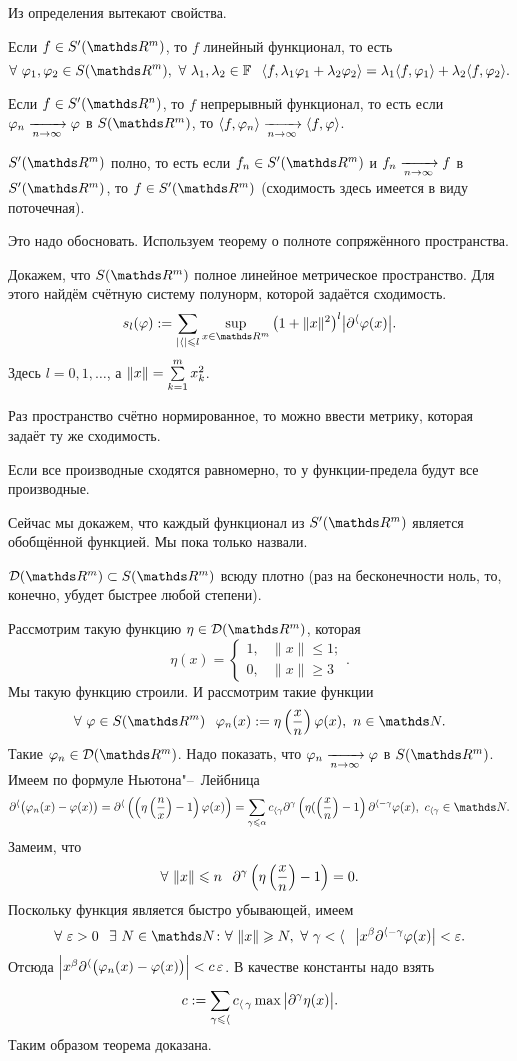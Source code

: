 Из определения вытекают свойства.
\begin{Ut}
 Если $f\in S'(\R^m)$, то $f$ линейный функционал, то есть 
\[
\forall\ \phi_1,\phi_2\in S(\R^m),\ \forall\ \l_1,\l_2\in\F\pau \la f,\l_1\phi_1+\l_2\phi_2\ra = \l_1\la f,\phi_1\ra + \l_2\la f,\phi_2\ra.
\]
\end{Ut}
\begin{Ut}
  Если $f\in S'(\R^n)$, то $f$ непрерывный функционал, то есть если $\varphi_n\xrightarrow[n\rightarrow\infty]{}\varphi$ в $S(\R^m)$, то $\langle f,\varphi_n\rangle\xrightarrow[n\rightarrow\infty]{} \langle f,\varphi\rangle$.
\end{Ut}
\begin{Ut}
$S'(\R^m)$ полно, то есть если $f_n\in S'(\R^m)$ и $f_n\xrightarrow[n\rightarrow\infty]{} f$ в $S'(\R^m)$, то $f\in S'(\R^m)$ (сходимость здесь имеется в виду поточечная).
\end{Ut}
Это надо обосновать. Используем теорему о полноте сопряжённого пространства.
\begin{Proof}
  Докажем, что $S(\R^m)$ полное линейное метрическое пространство. Для этого найдём счётную систему полунорм, которой задаётся сходимость.
\[
  s_l(\phi):=\sum\limits_{|\a|\le l}\sup\limits_{x\in\R^m}\big(1+\|x\|^2\big)^l\big|\dl^\a\phi(x)\big|.
\]
Здесь $l=0,1,\dots$, а $\|x\| = \sum\limits_{k = 1}^{m}x_k^2$.

Раз пространство счётно нормированное, то можно ввести метрику, которая задаёт ту же сходимость.

Если все производные сходятся равномерно, то у функции-предела будут все производные.
\end{Proof}
Сейчас мы докажем, что каждый функционал из $S'(\R^m)$ является обобщённой функцией. Мы пока только назвали.
\begin{Lem}
  $\D(\R^m)\subset S(\R^m)$ всюду плотно (раз на бесконечности ноль, то, конечно, убудет быстрее любой степени).
\end{Lem}
\begin{Proof}
  Рассмотрим такую функцию $\eta\in\D(\R^m)$, которая
\[\eta(x) = \begin{cases}
1,& \|x\|\le 1;\\ 0,&\|x\|\ge3
\end{cases}.\]
Мы такую функцию строили. И рассмотрим такие функции
\[
  \forall\ \phi\in S(\R^m)\pau \phi_n(x):=\eta\left(\frac xn\right)\phi(x),\ n\in\N.
\]
Такие $\phi_n\in\D(\R^m)$. Надо показать, что $\varphi_n\xrightarrow[n\rightarrow\infty]{} \varphi$ в $S(\R^m)$. Имеем по формуле Ньютона"--~Лейбница
\[
  \dl^\a\big(\phi_n(x)-\phi(x)\big) = \dl^\a\left(\left(\eta\left(\frac nx\right)-1\right)\phi(x)\right) = 
  \sum\limits_{\gamma\le \alpha}c_{\a\gamma}\dl^\gamma\left(\eta(\left(\frac xn\right)-1\right)\dl^{\a-\gamma}\phi(x),\ c_{\a\gamma}\in\N.
\]
Замеим, что
\[
  \forall\ \|x\|\le n\pau \dl^\g\left(\eta\left(\frac xn\right)-1\right)=0.
\]
Поскольку функция является быстро убывающей, имеем
\[
  \forall\ \e>0\pau \exists\ N\in\N\colon \forall\ \|x\|\ge N,\ \forall\ \g<\a\pau 
\big|x^\b\dl^{\a-\g}\phi(x)\big|<\e.
\]
Отсюда $\Big|x^\beta\partial^\langle\big(\varphi_n(x)-\varphi(x)\big)\Big|<c\,\varepsilon$. В качестве константы надо взять
\[
  c:= \sum\limits_{\gamma\leqslant \langle}c_{\langle\,\gamma}\max\big|\partial^\gamma\eta(x)\big|.
\]
Таким образом теорема доказана.
\end{Proof}


